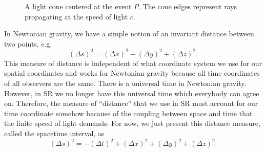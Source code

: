 \begin{bibunit}[unsrtnat]
\begin{figure}[htb]
   \centering
   \caption[Light cone centered at event $P$.]{A light cone centered at the
      event $P$. The cone edges represent rays propagating at the speed of light
      $c$.}
   \label{fig:light_cone}
\end{figure}

In Newtonian gravity, we have a simple notion of an invariant distance between
two points, e.g.
\begin{equation}
   (\Delta s)^2 = (\Delta x)^2 + (\Delta y)^2 + (\Delta z)^2.
\end{equation}
This measure of distance is independent of what coordinate system we use for our
spatial coordinates and works for Newtonian gravity because all time coordinates
of all observers are the same. There is a universal time in Newtonian gravity.
However, in SR we no longer have this universal time which everybody can agree
on. Therefore, the measure of ``distance'' that we use in SR must account for
our time coordinate somehow because of the coupling between space and time that
the finite speed of light demands. For now, we just present this distance
measure, called the spacetime interval, as
\begin{equation}\label{eq:spacetime-interval}
   (\Delta s)^2 = -(\Delta t)^2 + (\Delta x)^2 + (\Delta y)^2 + (\Delta z)^2.
\end{equation}


\end{bibunit}
